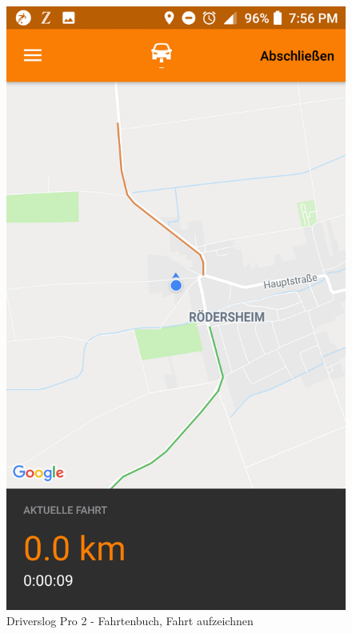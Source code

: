 \begin{figure}[H]%
    \begin{minipage}[b]{.4\linewidth} %
        \includegraphics[scale=0.14]{img/pro3}
        \caption{\label{img:img/pro3}Driverslog Pro 2 - Fahrtenbuch, Fahrt aufzeichnen}
    \end{minipage}
    \hspace{0.1\linewidth}%
    \begin{minipage}[b]{.4\linewidth} %

\end{minipage}
\end{figure}
